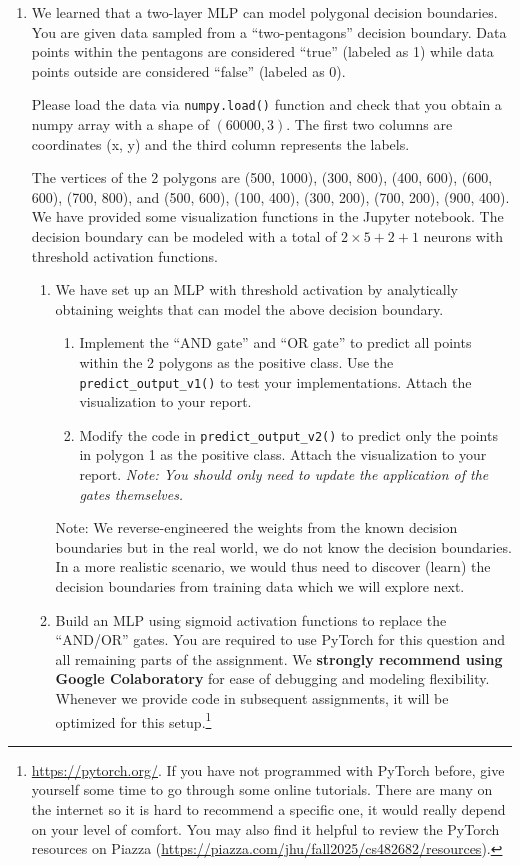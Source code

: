 \documentclass[a4paper]{article}
\begin{document}
	\begin{enumerate}
		\item We learned that a two-layer MLP can model polygonal decision boundaries. You are given data sampled from a ``two-pentagons'' decision boundary. Data points within the pentagons are considered ``true'' (labeled as 1) while data points outside are considered ``false'' (labeled as 0).  
		
		Please load the data via \texttt{numpy.load()} function and check that you obtain a numpy array with a shape of $(60000, 3)$. The first two columns are coordinates (x, y) and the third column represents the labels. 
		
		The vertices of the 2 polygons are (500, 1000), (300, 800), (400, 600), (600, 600), (700, 800), and (500, 600), (100, 400), (300, 200), (700, 200), (900, 400). We have provided some visualization functions in the Jupyter notebook. The decision boundary can be modeled with a total of $2\times 5 + 2 + 1$ neurons with threshold activation functions. 
	
		\begin{enumerate}
			\item We have set up an MLP with threshold activation by analytically obtaining weights that can model the above decision boundary. 
				\begin{enumerate}
					\item Implement the ``AND gate'' and ``OR gate'' to predict all points within the 2 polygons as the positive class. Use the \texttt{predict\_output\_v1()} to test your implementations. Attach the visualization to your report. 
					\item Modify the code in \texttt{predict\_output\_v2()} to predict only the points in polygon 1 as the positive class. Attach the visualization to your report. \emph{Note: You should only need to update the application of the gates themselves.}
				\end{enumerate}			
			Note: We reverse-engineered the weights from the known decision boundaries but in the real world, we do not know the decision boundaries. In a more realistic scenario, we would thus need to discover (learn) the decision boundaries from training data which we will explore next. 

			\item Build an MLP using sigmoid activation functions to replace the ``AND/OR'' gates. You are required to use PyTorch for this question and all remaining parts of the assignment. We \textbf{strongly recommend using Google Colaboratory} for ease of debugging and modeling flexibility. Whenever we provide code in subsequent assignments, it will be optimized for this setup.\footnote{\url{https://pytorch.org/}. If you have not programmed with PyTorch before, give yourself some time to go through some online tutorials. There are many on the internet so it is hard to recommend a specific one, it would really depend on your level of comfort. You may also find it helpful to review the PyTorch resources on Piazza (\url{https://piazza.com/jhu/fall2025/cs482682/resources}).} 
			

\end{enumerate}
\end{enumerate}
\end{document}
